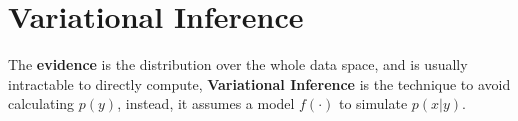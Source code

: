 \documentclass{article}
\begin{document}
\section{Variational Inference}
The \textbf{evidence} is the distribution over the whole data space, and is usually intractable to directly compute, \textbf{Variational Inference} is the technique to avoid calculating $p(y)$, instead, it assumes a model $f(\cdot)$ to simulate $p(x|y)$.
\end{document}

